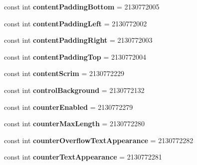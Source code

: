 \begin{DoxyCompactItemize}
const int {\bfseries content\+Padding\+Bottom} = 2130772005
\item 
\mbox{\label{classXaria_1_1Resource_1_1Attribute_abe3652fbc383158bb4328d2ea22f8890}} 
const int {\bfseries content\+Padding\+Left} = 2130772002
\item 
\mbox{\label{classXaria_1_1Resource_1_1Attribute_abadf0d54ad1113d1aa8e92a036c0432b}} 
const int {\bfseries content\+Padding\+Right} = 2130772003
\item 
\mbox{\label{classXaria_1_1Resource_1_1Attribute_acc318689e0e17999e655abbbc66aaaf2}} 
const int {\bfseries content\+Padding\+Top} = 2130772004
\item 
\mbox{\label{classXaria_1_1Resource_1_1Attribute_ab952809b1bc74fd11475ce0b360a5c2e}} 
const int {\bfseries content\+Scrim} = 2130772229
\item 
\mbox{\label{classXaria_1_1Resource_1_1Attribute_a2f675a020fe02b7e4ec57217091c6374}} 
const int {\bfseries control\+Background} = 2130772132
\item 
\mbox{\label{classXaria_1_1Resource_1_1Attribute_a04ef7cd61262b0195cee3a81360ed632}} 
const int {\bfseries counter\+Enabled} = 2130772279
\item 
\mbox{\label{classXaria_1_1Resource_1_1Attribute_a7594dfe4b2d5cebc63463bd7f061a8f7}} 
const int {\bfseries counter\+Max\+Length} = 2130772280
\item 
\mbox{\label{classXaria_1_1Resource_1_1Attribute_a813f978a40a71ab2b9eb78eccef4b5bc}} 
const int {\bfseries counter\+Overflow\+Text\+Appearance} = 2130772282
\item 
\mbox{\label{classXaria_1_1Resource_1_1Attribute_a4c4687bad91dec240a63ae3f2f772cd7}} 
const int {\bfseries counter\+Text\+Appearance} = 2130772281
\item 
\mbox{\label{classXaria_1_1Resource_1_1Attribute_aa5c6456b6bae818d2a2c825fafa192c1}} 

\end{DoxyCompactItemize}
